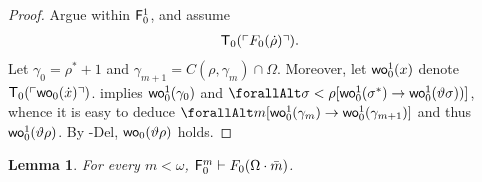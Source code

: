 \documentclass[UKenglish,cleveref,DIV=12]{scrartcl}
\let\forall\forallAlt
\newtheorem{lemma}{Lemma}
\theoremstyle{definition}
\theoremstyle{definition}
\begin{document}
\begin{proof}
Argue within $\mathsf{F}_0^1$, and assume
\begin{align}\label{exteqn:F0tech1}
  \mathsf{T}_0(\ulcorner{F_0(\dot\rho)}\urcorner).
\end{align}
Let $\gamma_0=\rho^*+1$ and $\gamma_{m+1}=C(\rho,\gamma_m)\cap\Omega$.
Moreover, let $\mathsf{wo}_0^1(x)$ denote $\mathsf{T}_0(\ulcorner{\mathsf{wo}_0(\dot x)}\urcorner)$.
 implies $\mathsf{wo}_0^1(\gamma_0)$ and
$\forall\sigma<\rho[\wo_0^1(\sigma^*)\rightarrow\wo_0^1(\vartheta\sigma))]$, whence
it is easy to deduce $\forall m[\wo_0^1(\gamma_m)\rightarrow\wo_0^1(\gamma_{m+1})]$
and thus $\mathsf{wo}_0^1(\vartheta\rho)$. By -Del, $\mathsf{wo}_0(\vartheta\rho)$ holds.
\end{proof}
\begin{lemma}\label{extprop:F0wellordering}
  For every $m<\omega$, $\mathsf{F}_0^m\vdash F_0(\Omega\cdot\bar{m})$.
\end{lemma}
\end{document}

